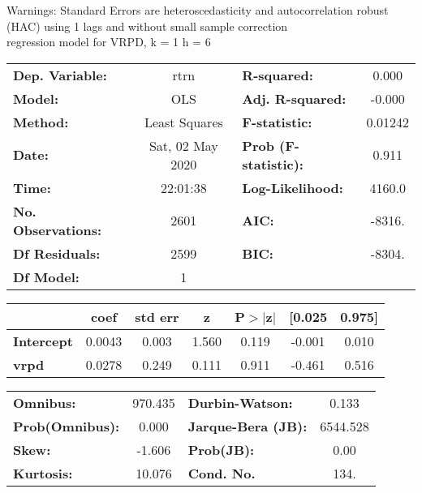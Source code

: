 Warnings: \newline
 [1] Standard Errors are heteroscedasticity and autocorrelation robust (HAC) using 1 lags and without small sample correction\\ 

regression model for VRPD, k = 1 h = 6\begin{center}
\begin{tabular}{lclc}
\toprule
\textbf{Dep. Variable:}    &       rtrn       & \textbf{  R-squared:         } &     0.000   \\
\textbf{Model:}            &       OLS        & \textbf{  Adj. R-squared:    } &    -0.000   \\
\textbf{Method:}           &  Least Squares   & \textbf{  F-statistic:       } &   0.01242   \\
\textbf{Date:}             & Sat, 02 May 2020 & \textbf{  Prob (F-statistic):} &    0.911    \\
\textbf{Time:}             &     22:01:38     & \textbf{  Log-Likelihood:    } &    4160.0   \\
\textbf{No. Observations:} &        2601      & \textbf{  AIC:               } &    -8316.   \\
\textbf{Df Residuals:}     &        2599      & \textbf{  BIC:               } &    -8304.   \\
\textbf{Df Model:}         &           1      & \textbf{                     } &             \\
\bottomrule
\end{tabular}
\begin{tabular}{lcccccc}
                   & \textbf{coef} & \textbf{std err} & \textbf{z} & \textbf{P$> |$z$|$} & \textbf{[0.025} & \textbf{0.975]}  \\
\midrule
\textbf{Intercept} &       0.0043  &        0.003     &     1.560  &         0.119        &       -0.001    &        0.010     \\
\textbf{vrpd}      &       0.0278  &        0.249     &     0.111  &         0.911        &       -0.461    &        0.516     \\
\bottomrule
\end{tabular}
\begin{tabular}{lclc}
\textbf{Omnibus:}       & 970.435 & \textbf{  Durbin-Watson:     } &    0.133  \\
\textbf{Prob(Omnibus):} &   0.000 & \textbf{  Jarque-Bera (JB):  } & 6544.528  \\
\textbf{Skew:}          &  -1.606 & \textbf{  Prob(JB):          } &     0.00  \\
\textbf{Kurtosis:}      &  10.076 & \textbf{  Cond. No.          } &     134.  \\
\bottomrule
\end{tabular}
\end{center}

